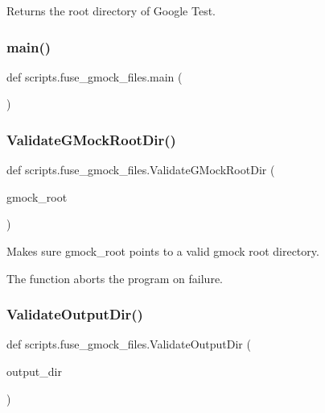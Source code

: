 \begin{DoxyVerb}Returns the root directory of Google Test.\end{DoxyVerb}
 \mbox{\label{namespacescripts_1_1fuse__gmock__files_aedb6e9c7e3b6b0e773d6a91ccd460d03}} 
\subsubsection{\texorpdfstring{main()}{main()}}
{\footnotesize\ttfamily def scripts.\+fuse\+\_\+gmock\+\_\+files.\+main (\begin{DoxyParamCaption}{ }\end{DoxyParamCaption})}

\mbox{\label{namespacescripts_1_1fuse__gmock__files_aa99dcc999c211d9c7384a5f599839519}} 
\subsubsection{\texorpdfstring{ValidateGMockRootDir()}{ValidateGMockRootDir()}}
{\footnotesize\ttfamily def scripts.\+fuse\+\_\+gmock\+\_\+files.\+Validate\+G\+Mock\+Root\+Dir (\begin{DoxyParamCaption}\item[{}]{gmock\+\_\+root }\end{DoxyParamCaption})}

\begin{DoxyVerb}Makes sure gmock_root points to a valid gmock root directory.

The function aborts the program on failure.
\end{DoxyVerb}
 \mbox{\label{namespacescripts_1_1fuse__gmock__files_a8a8a8aee48bb6d3758d0f9f04210d1f8}} 
\subsubsection{\texorpdfstring{ValidateOutputDir()}{ValidateOutputDir()}}
{\footnotesize\ttfamily def scripts.\+fuse\+\_\+gmock\+\_\+files.\+Validate\+Output\+Dir (\begin{DoxyParamCaption}\item[{}]{output\+\_\+dir }\end{DoxyParamCaption})}

